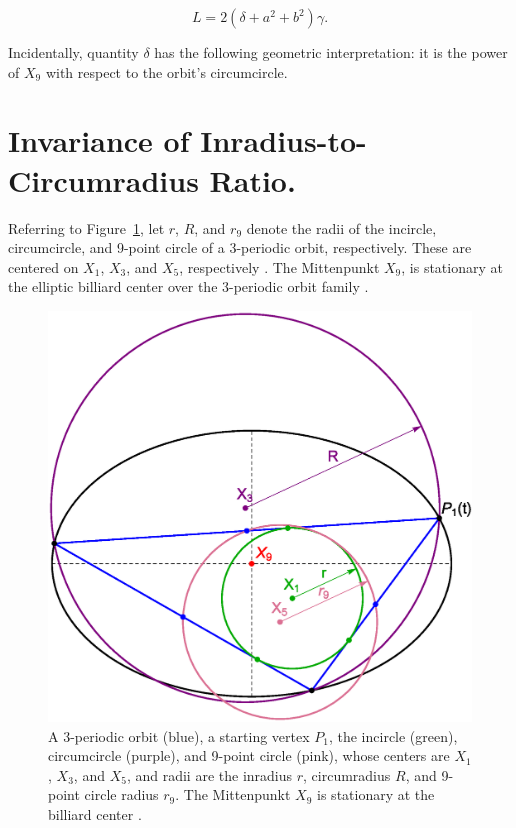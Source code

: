 \documentclass{article}
\theoremstyle{definition}
\begin{document}
\begin{equation}
L=2(\delta+a^2+b^2)\gamma.
\label{eqn:perimeter}
\end{equation}

\noindent Incidentally, quantity $\delta$ has the following geometric interpretation: it is the power of $X_9$ with respect to the orbit's circumcircle.


\section{Invariance of Inradius-to-Circumradius Ratio.}
\label{sec:rovr}
Referring to  Figure~\ref{fig:radii}, let $r$, $R$, and $r_9$ denote the radii of the incircle, circumcircle, and 9-point circle of a 3-periodic orbit, respectively. These are centered on $X_1$, $X_3$, and $X_5$, respectively \cite{coxeter67}. The Mittenpunkt $X_9$, is stationary at the elliptic billiard center over the 3-periodic orbit family \cite{reznik2019-intelligencer}.

\begin{figure}[H]
    \centering
    \includegraphics[width=.75\textwidth]{1040_Radii.eps}
    \caption{A 3-periodic orbit (blue), a starting vertex $P_1$, the incircle (green), circumcircle (purple), and 9-point circle (pink), whose centers are $X_1$, $X_3$, and $X_5$, and radii are the inradius $r$, circumradius $R$, and 9-point circle radius $r_9$. The Mittenpunkt $X_9$ is stationary at the billiard center \cite{reznik2019-intelligencer}.}
    \label{fig:radii}
\end{figure}
\end{document}
